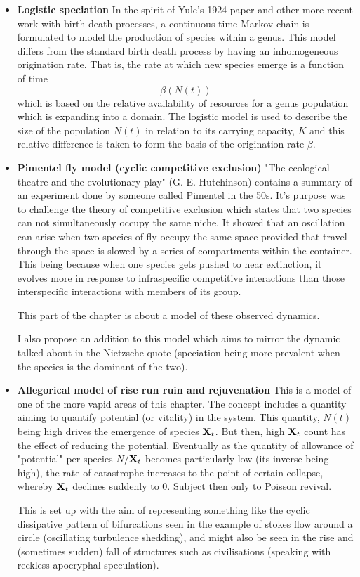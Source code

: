 \begin{itemize}
\item  \textbf{ Logistic speciation} In the spirit of Yule's 1924 paper and other more recent work with birth death processes, \cite{nee1994extinction} a continuous time Markov chain is formulated to model the production of species within a genus.  This model differs from the standard birth death process by having an inhomogeneous origination rate.  That is, the rate at which new species emerge is a function of time 
$$\beta(N(t)) $$
which is based on the relative availability of resources for a genus population which is expanding into a domain. The logistic model is used to describe the size of the population $N(t)$ in relation to its carrying capacity,  $K$  and this relative difference is taken to form the basis of the origination rate $\beta$. 


\item \textbf{ Pimentel fly model (cyclic competitive exclusion)}
"The ecological theatre and the evolutionary play" (G.  E.  Hutchinson) contains a summary of an experiment done by someone called Pimentel in the 50s.  It's purpose was to challenge the theory of competitive exclusion which states that two species can not simultaneously occupy the same niche.  It showed that an oscillation can arise when two species of fly occupy the same space provided that travel through the space is slowed by a series of compartments within the container.  This being because when one species gets pushed to near extinction,  it evolves more in response to infraspecific competitive interactions than those interspecific interactions with members of its group. \par 
This part of the chapter is about a model of these observed dynamics.\par
I also propose an addition to this model which aims to mirror the dynamic talked about in the Nietzsche quote (speciation being more prevalent when the species is the dominant of the two). 


\item \textbf{Allegorical model of rise run ruin and rejuvenation}
This is a model of one of the more vapid areas of this chapter.  The concept includes a quantity aiming to quantify potential (or vitality) in the system. This quantity,  $N(t)$ being high drives the emergence of species ${{\bf X}_t}$.  But then, high ${{\bf X}_t}$ count has the effect of reducing the potential.  Eventually as the quantity of allowance of "potential" per species $N/{{\bf X}_t}$ becomes particularly low (its inverse being high), the rate of catastrophe increases to the point of certain collapse,  whereby ${{\bf X}_t}$ declines suddenly to 0.  Subject then only to Poisson revival.  \par 

This is set up with the aim of representing something like the cyclic dissipative pattern of bifurcations seen in the example of stokes flow around a circle (oscillating turbulence shedding), and might also be seen in the rise and (sometimes sudden) fall of structures such as civilisations (speaking with reckless apocryphal speculation).  

\end{itemize}
